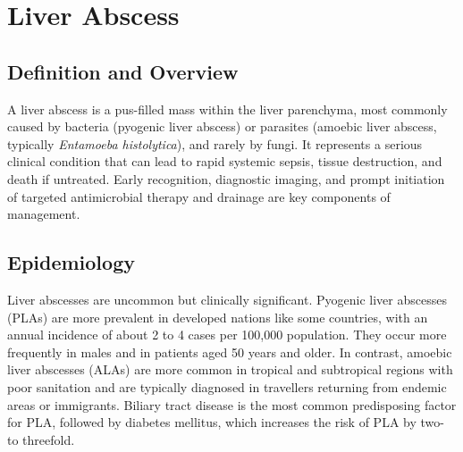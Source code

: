 \chapter{Liver Abscess}

\section*{Definition and Overview}
A liver abscess is a pus-filled mass within the liver parenchyma, most commonly caused by bacteria (pyogenic liver abscess) or parasites (amoebic liver abscess, typically \textit{Entamoeba histolytica}), and rarely by fungi. It represents a serious clinical condition that can lead to rapid systemic sepsis, tissue destruction, and death if untreated. Early recognition, diagnostic imaging, and prompt initiation of targeted antimicrobial therapy and drainage are key components of management.

\section*{Epidemiology}
Liver abscesses are uncommon but clinically significant. Pyogenic liver abscesses (PLAs) are more prevalent in developed nations like some countries, with an annual incidence of about 2 to 4 cases per 100,000 population. They occur more frequently in males and in patients aged 50 years and older. In contrast, amoebic liver abscesses (ALAs) are more common in tropical and subtropical regions with poor sanitation and are typically diagnosed in travellers returning from endemic areas or immigrants. Biliary tract disease is the most common predisposing factor for PLA, followed by diabetes mellitus, which increases the risk of PLA by two- to threefold.

